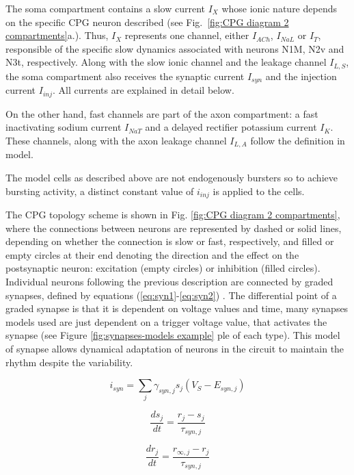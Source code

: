 The soma compartment contains a slow current $I_X$ whose ionic nature depends on the specific CPG neuron described (see Fig.~\ref{fig:CPG diagram 2 compartments}a.). Thus, $I_X$  represents one channel, either $I_{ACh}$, $I_{NaL}$ or $I_{T}$, responsible of the specific slow dynamics associated with neurons N1M, N2v and N3t, respectively.  Along with the slow ionic channel and the leakage channel  $I_{L,S}$, the soma compartment also receives the synaptic current $I_{syn}$ and the injection current $I_{inj}$. All currents are explained in detail below.

On the other hand, fast channels are part of the axon compartment: a fast inactivating sodium current $I_{NaT}$ and a delayed rectifier potassium current $I_{K}$. These channels, along with the axon leakage channel  $I_{L,A}$ follow the definition in \cite{HODGKIN1952} model.

The model cells as described above are not endogenously bursters so to achieve bursting activity, a distinct constant value of  \(i_{inj}\) is applied to the cells. 

The CPG topology scheme is shown in Fig. \ref{fig:CPG diagram 2 compartments}, where the connections between neurons are represented by dashed or solid lines, depending on whether the connection is slow or fast, respectively, and filled or empty circles at their end denoting the direction and the effect on the postsynaptic neuron: excitation (empty circles) or inhibition (filled circles).
Individual neurons following the previous description are connected by graded synapses, defined by equations (\ref{eq:syn1}-\ref{eq:syn2}) \cite{Vavoulis2007}. The differential point of a graded synapse is that it is dependent on voltage values and time, many synapses models used are just dependent on a trigger voltage value, that activates the synapse (see Figure \ref{fig:synapses-models example} ple of each type). This model of synapse allows dynamical adaptation of neurons in the circuit to maintain the rhythm despite the variability. 

\begin{equation}
	i_{syn} = \sum_j \gamma_{syn,j} s_j (V_S - E_{syn,j})
	\label{eq:syn1}
\end{equation}

\begin{equation}
	\frac{ds_j}{dt} = \frac{r_{j}-s_j}{\tau_{syn,j}}
\end{equation}

\begin{equation}
	\frac{dr_j}{dt} = \frac{r_{\infty,j}-r_j}{\tau_{syn,j}}
\end{equation}

